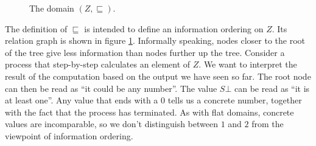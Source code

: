 \documentclass[a4paper]{article}
\begin{document}
\begin{figure}
\begin{center}
\end{center}
\caption{The domain $(Z, \sqsubseteq)$.}
\label{fig:DomainOfNuF}
\end{figure}

The definition of $\sqsubseteq$ is intended to define an information ordering on
$Z$.  Its relation graph is shown in figure \ref{fig:DomainOfNuF}.
Informally speaking, nodes closer to the root of the tree give less information
than nodes further up the tree.  Consider a process that step-by-step calculates
an element of $Z$.  We want to interpret the result of the computation
based on the output we have seen so far.  The root node can then be read as ``it
could be any number''.  The value $S\bot$ can be read as ``it is at least one''.
Any value that ends with a $0$ tells us a concrete number, together with the
fact that the process has terminated.  As with flat domains, concrete values are
incomparable, so we don't distinguish between $1$ and $2$ from the viewpoint of
information ordering.
\end{document}
